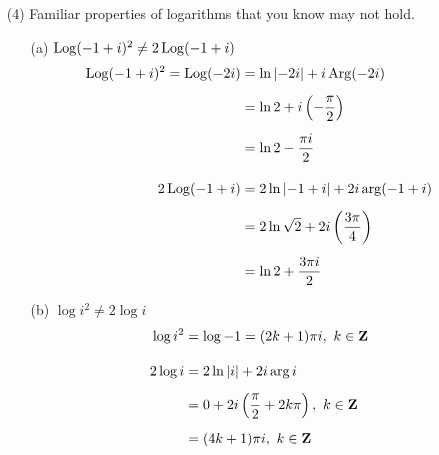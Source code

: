 \begin{example}
\begin{itemize}
\item[(4)] Familiar properties of logarithms that you know may not hold.
\begin{itemize}
\item[(a)] $\operatorname{Log}(-1 + i)^2 \neq 2\operatorname{Log} (-1 + i)$
\begin{align*}
\operatorname{Log}(-1 + i)^2 = \operatorname{Log}(-2i) &= \ln\left\lvert-2i\right\rvert + i\operatorname{Arg}(-2i)\\[0.5em]
&= \ln 2 + i\left(-\dfrac{\pi}{2}\right)\\[0.5em]
&= \ln 2 - \dfrac{\pi i}{2}\\[1em]
2\operatorname{Log} (-1 + i) &= 2\ln\left\lvert-1 + i\right\rvert + 2i\arg(-1 + i)\\[0.5em]
&= 2\ln\sqrt{2} + 2i\left(\dfrac{3\pi}{4}\right)\\[0.5em]
&= \ln 2 + \dfrac{3\pi i}{2}
\end{align*}
\item[(b)] $\log i^2 \neq 2\log i$
\begin{align*}
\log i^2 &= \log -1 = (2k+1)\pi i,\ k \in \mathbf Z\\[1em]
2\log i &= 2\ln\left\lvert i\right\rvert + 2i\arg i\\[0.5em]
&= 0 + 2i\left(\dfrac{\pi}{2} + 2k\pi\right),\ k \in \mathbf Z\\[0.5em]
&= (4k + 1)\pi i,\ k \in \mathbf Z
\end{align*}
\end{itemize}
\end{itemize}
\end{example}

\medskip

